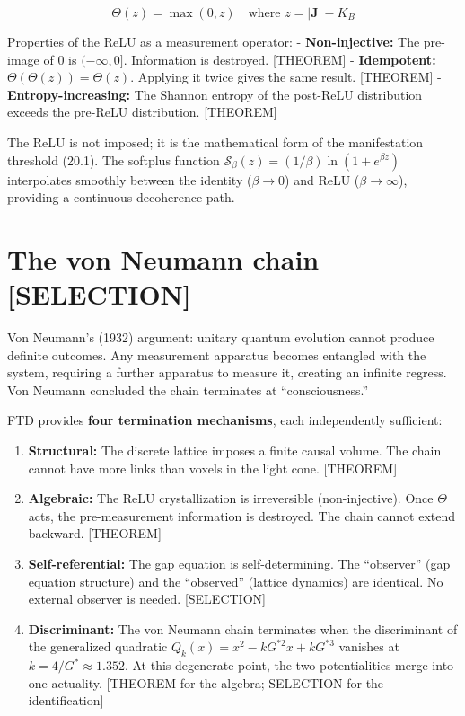 \documentclass[
  11pt,
  letterpaper,
  twoside,
  openany]{book}
\makeatletter
\let\orig@section\section
\renewcommand{\section}{\needspace{8\baselineskip}\orig@section}
\newcommand{\Gs}{G^{*}{}}
\newcommand{\Gssq}{G^{*2}{}}      %
\newcommand{\Gscu}{G^{*3}{}}      %
\makeatother
\begin{document}
\[
\Theta(z) = \max(0, z) \quad \text{where } z = |\mathbf{J}| - K_B
\tag{20.1}
\]

Properties of the ReLU as a measurement operator: -
\textbf{Non-injective:} The pre-image of \(0\) is \((-\infty, 0]\).
Information is destroyed. {[}THEOREM{]} - \textbf{Idempotent:}
\(\Theta(\Theta(z)) = \Theta(z)\). Applying it twice gives the same
result. {[}THEOREM{]} - \textbf{Entropy-increasing:} The Shannon entropy
of the post-ReLU distribution exceeds the pre-ReLU distribution.
{[}THEOREM{]}

The ReLU is not imposed; it is the mathematical form of the
manifestation threshold (20.1). The softplus function
\(\mathcal{S}_\beta(z) = (1/\beta)\ln(1 + e^{\beta z})\) interpolates
smoothly between the identity (\(\beta \to 0\)) and ReLU
(\(\beta \to \infty\)), providing a continuous decoherence path.

\section{The von Neumann chain
{[}SELECTION{]}}\label{the-von-neumann-chain-selection}

Von Neumann's (1932) argument: unitary quantum evolution cannot produce
definite outcomes. Any measurement apparatus becomes entangled with the
system, requiring a further apparatus to measure it, creating an
infinite regress. Von Neumann concluded the chain terminates at
``consciousness.''

FTD provides \textbf{four termination mechanisms}, each independently
sufficient:

\begin{enumerate}
\def\labelenumi{\arabic{enumi}.}
\item
  \textbf{Structural:} The discrete lattice imposes a finite causal
  volume. The chain cannot have more links than voxels in the light
  cone. {[}THEOREM{]}
\item
  \textbf{Algebraic:} The ReLU crystallization is irreversible
  (non-injective). Once \(\Theta\) acts, the pre-measurement information
  is destroyed. The chain cannot extend backward. {[}THEOREM{]}
\item
  \textbf{Self-referential:} The gap equation is self-determining. The
  ``observer'' (gap equation structure) and the ``observed'' (lattice
  dynamics) are identical. No external observer is needed.
  {[}SELECTION{]}
\item
  \textbf{Discriminant:} The von Neumann chain terminates when the
  discriminant of the generalized quadratic
  \(Q_k(x) = x^2 - k\Gssq x + k\Gscu\) vanishes at
  \(k = 4/\Gs \approx 1.352\). At this degenerate point, the two
  potentialities merge into one actuality. {[}THEOREM for the algebra;
  SELECTION for the identification{]}
\end{enumerate}
\end{document}
